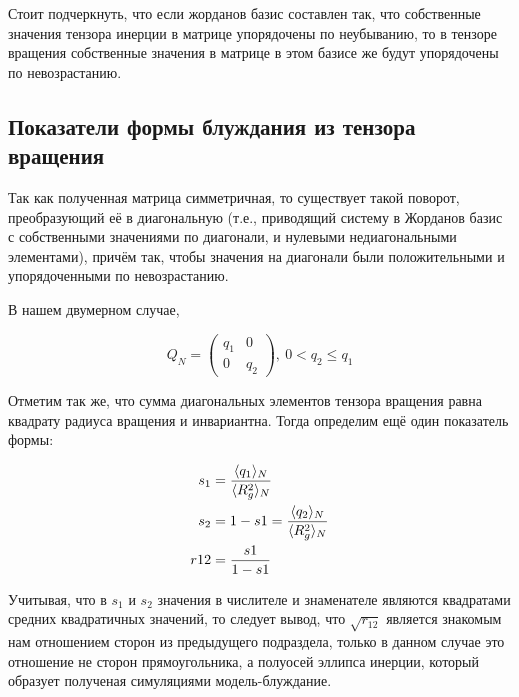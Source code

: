 Стоит подчеркнуть, что если жорданов базис составлен так, что собственные значения тензора инерции в матрице упорядочены по неубыванию, то в тензоре вращения собственные значения в матрице в этом базисе же будут упорядочены по невозрастанию.

\subsection{Показатели формы блуждания из тензора вращения}

Так как полученная матрица симметричная, то существует такой поворот, преобразующий её в диагональную (т.е., приводящий систему в Жорданов базис с собственными значениями по диагонали, и нулевыми недиагональными элементами), причём так, чтобы значения на диагонали были положительными и упорядоченными по невозрастанию.

В нашем двумерном случае, 

\begin{equation*}
    Q_{N} = \left(
    \begin{array}{cc}
      q_{1} & 0 \\
      0 & q_{2}
    \end{array} \right),\ 0 < q_{2} \leq q_{1}
\end{equation*}

Отметим так же, что сумма диагональных элементов тензора вращения равна квадрату радиуса вращения и инвариантна. Тогда определим ещё один показатель формы:

\begin{align*}
    s_{1} &= \frac{\langle q_{1} \rangle_{N}}{\langle R_{g}^{2} \rangle_{N}}\\
    s_{2} &= 1 - s1 = \frac{\langle q_{2} \rangle_{N}}{\langle R_{g}^{2} \rangle_{N}}\\
    r12 &= \frac{s1}{1-s1}
\end{align*}

Учитывая, что в $s_{1}$ и $s_{2}$ значения в числителе и знаменателе являются квадратами средних квадратичных значений, то следует вывод, что $\sqrt{r_{12}}$ является знакомым нам отношением сторон из предыдущего подраздела, только в данном случае это отношение не сторон прямоугольника, а полуосей эллипса инерции, который образует полученая симуляциями модель-блуждание.

